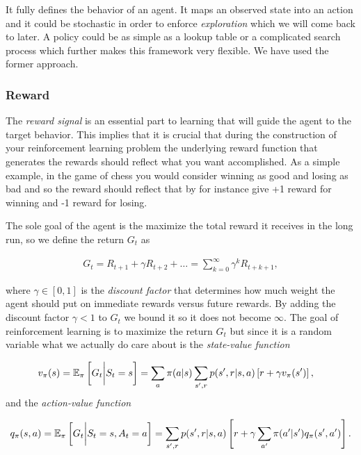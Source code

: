 \documentclass[result.tex]{subfiles}
\begin{document}
    It fully defines the behavior of an agent. It maps an observed state into an action and it could be stochastic in order to enforce \textit{exploration} which we will come back to later. A policy could be as simple as a lookup table or a complicated search process which further makes this framework very flexible. We have used the former approach.

    \subsubsection*{Reward}

    The \textit{reward signal} is an essential part to learning that will guide the agent to the target behavior. This implies that it is crucial that during the construction of your reinforcement learning problem the underlying reward function that generates the rewards should reflect what you want accomplished. As a simple example, in the game of chess you would consider winning as good and losing as bad and so the reward should reflect that by for instance give +1 reward for winning and -1 reward for losing.

    The sole goal of the agent is the maximize the total reward it receives in the long run, so we define the return $G_t$ as

    \begin{align*}
        G_t = R_{t + 1} + \gamma R_{t + 2} + \ldots = \sum_{k = 0}^{\infty} \gamma^k R_{t + k + 1},
    \end{align*}

    where $\gamma \in \left[0, 1 \right]$ is the \textit{discount factor} that determines how much weight the agent should put on immediate rewards versus future rewards. By adding the discount factor $\gamma < 1$ to $G_t$ we bound it so it does not become $\infty$. The goal of reinforcement learning is to maximize the return $G_t$ but since it is a random variable what we actually do care about is the \textit{state-value function}

    \begin{align*}
        v_{\pi}(s) &= \mathbb{E}_\pi \left[ G_t \bigg\rvert S_t = s \right]
        = \sum_a \pi(a | s) \sum_{s^\prime, r} p(s^\prime, r | s, a) \left[ r + \gamma v_\pi(s^\prime) \right],
    \end{align*}
    and the \textit{action-value function}

    \begin{align*}
        q_{\pi}(s, a) = \mathbb{E}_\pi \left[ G_t \bigg\rvert S_t = s, A_t = a \right]
        = \sum_{s^\prime, r} p(s^\prime, r | s, a) \left[ r + \gamma \sum_{a^\prime} \pi(a^\prime | s^\prime) q_\pi(s^\prime, a^\prime) \right].
    \end{align*}
\end{document}
